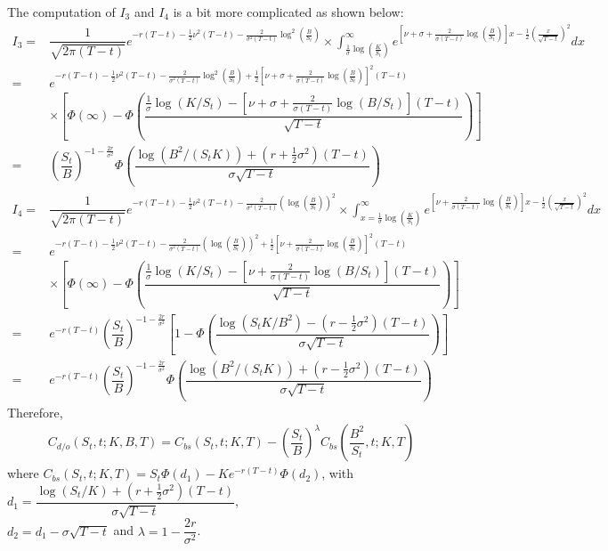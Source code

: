 \documentclass[12pt]{article}
\begin{document}
	The computation of $I_3$ and $I_4$ is a bit more complicated as shown below:
	\begin{align*}
	I_3=&\dfrac{1}{\sqrt{2\pi (T-t)}}e^{-r(T-t)-\frac{1}{2}\nu^2(T-t)-\frac{2}{\sigma^2(T-t)}\log^2\left(\frac{B}{S_t}\right)}
	\times\displaystyle \int_{\frac{1}{\sigma}\log\left(\frac{K}{S_t}\right) }^{\infty}e^{\left[\nu+\sigma+\frac{2}{\sigma(T-t)}\log\left(\frac{B}{S_t}\right)\right] x-\frac{1}{2}\left(\frac{ x}{\sqrt{T-t}}\right)^2}d x\\
	=&e^{-r(T-t)-\frac{1}{2}\nu^2(T-t)-\frac{2}{\sigma^2(T-t)}\log^2\left(\frac{B}{S_t}\right)+\frac{1}{2}\left[\nu+\sigma+\frac{2}{\sigma(T-t)}\log\left(\frac{B}{S_t}\right)\right]^2(T-t)}\\
	&\times \left[\Phi(\infty)-\Phi\left(\dfrac{\frac{1}{\sigma}\log(K/S_t)-\left[\nu+\sigma+\frac{2}{\sigma(T-t)}\log(B/S_t)\right](T-t)}{\sqrt{T-t}}\right)\right]\\
	=&\left(\dfrac{S_t}{B}\right)^{-1-\frac{2r}{\sigma^2}}\Phi\left(\dfrac{\log(B^2/(S_tK))+(r+\frac{1}{2}\sigma^2)(T-t)}{\sigma\sqrt{T-t}}\right)
	\end{align*}
	\begin{align*}I_4=&\dfrac{1}{\sqrt{2\pi (T-t)}}e^{-r(T-t)-\frac{1}{2}\nu^2(T-t)-\frac{2}{\sigma^2(T-t)}\left(\log\left(\frac{B}{S_t}\right)\right)^2}\times\displaystyle \int_{ x =\frac{1}{\sigma}\log\left(\frac{K}{S_t}\right) }^{\infty}e^{\left[\nu+\frac{2}{\sigma(T-t)}\log\left(\frac{B}{S_t}\right)\right] x-\frac{1}{2}\left(\frac{ x}{\sqrt{T-t}}\right)^2}d x\\
	=&e^{-r(T-t)-\frac{1}{2}\nu^2(T-t)-\frac{2}{\sigma^2(T-t)}\left(\log\left(\frac{B}{S_t}\right)\right)^2+\frac{1}{2}\left[\nu+\frac{2}{\sigma(T-t)}\log\left(\frac{B}{S_t}\right)\right]^2(T-t)}\\
	&\times \left[\Phi(\infty)-\Phi\left(\dfrac{\frac{1}{\sigma}\log(K/S_t)-\left[\nu+\frac{2}{\sigma(T-t)}\log(B/S_t)\right](T-t)}{\sqrt{T-t}}\right)\right]\\
	=&e^{-r(T-t)}\left(\dfrac{S_t}{B}\right)^{-1-\frac{2r}{\sigma^2}}\left[1-\Phi\left(\dfrac{\log(S_tK/B^2)-(r-\frac{1}{2}\sigma^2)(T-t)}{\sigma\sqrt{T-t}}\right)\right]\\
	=&e^{-r(T-t)}\left(\dfrac{S_t}{B}\right)^{-1-\frac{2r}{\sigma^2}}\Phi\left(\dfrac{\log(B^2/(S_tK))+(r-\frac{1}{2}\sigma^2)(T-t)}{\sigma\sqrt{T-t}}\right)
\end{align*}
Therefore, 
\begin{align}\label{main}
	C_{d/o}\left(S_t,t;K,B,T\right)
=	C_{bs}\left(S_t,t;K,T\right)-\left(\dfrac{S_t}{B}\right)^{\lambda}C_{bs}\left(\dfrac{B^2}{S_t},t;K,T\right)
\end{align}
where 
$
	C_{bs}(S_t,t;K,T)=S_t\Phi(d_1)-Ke^{-r(T-t)}\Phi(d_2)$, with
	$d_1=\dfrac{\log(S_t/K)+(r+\frac{1}{2}\sigma^2)(T-t)}{\sigma\sqrt{T-t}}$,\\
	$d_2=d_1-\sigma\sqrt{T-t}$ and  $\lambda = 1-\dfrac{2r}{\sigma^2}$.
\end{document}
